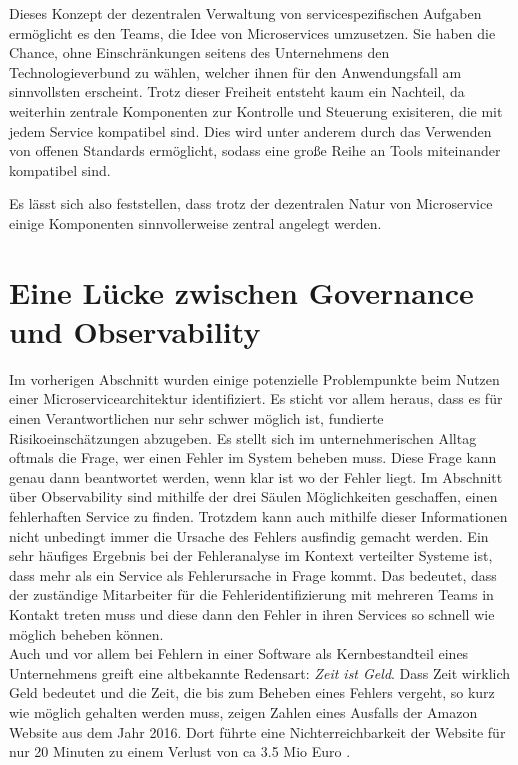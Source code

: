 Dieses Konzept der dezentralen Verwaltung von servicespezifischen Aufgaben ermöglicht es den Teams, die Idee von Microservices umzusetzen. Sie haben die Chance, ohne Einschränkungen seitens des Unternehmens den Technologieverbund zu wählen, welcher ihnen für den Anwendungsfall am sinnvollsten erscheint. Trotz dieser Freiheit entsteht kaum ein Nachteil, da weiterhin zentrale Komponenten zur Kontrolle und Steuerung exisiteren, die mit jedem Service kompatibel sind. Dies wird unter anderem durch das Verwenden von offenen Standards ermöglicht, sodass eine große Reihe an Tools miteinander kompatibel sind.

Es lässt sich also feststellen, dass trotz der dezentralen Natur von Microservice einige Komponenten sinnvollerweise zentral angelegt werden\autocite[S. 155ff]{microservice_enterprise}.

\section{Eine Lücke zwischen Governance und Observability}

Im vorherigen Abschnitt wurden einige potenzielle Problempunkte beim Nutzen einer Microservicearchitektur identifiziert. Es sticht vor allem heraus, dass es für einen Verantwortlichen nur sehr schwer möglich ist, fundierte Risikoeinschätzungen abzugeben. Es stellt sich im unternehmerischen Alltag oftmals die Frage, wer einen Fehler im System beheben muss. Diese Frage kann genau dann beantwortet werden, wenn klar ist wo der Fehler liegt. Im Abschnitt über Observability sind mithilfe der drei Säulen Möglichkeiten geschaffen, einen fehlerhaften Service zu finden. Trotzdem kann auch mithilfe dieser Informationen nicht unbedingt immer die Ursache des Fehlers ausfindig gemacht werden. Ein sehr häufiges Ergebnis bei der Fehleranalyse im Kontext verteilter Systeme ist, dass mehr als ein Service als Fehlerursache in Frage kommt. Das bedeutet, dass der zuständige Mitarbeiter für die Fehleridentifizierung mit mehreren Teams in Kontakt treten muss und diese dann den Fehler in ihren Services so schnell wie möglich beheben können. \\
Auch und vor allem bei Fehlern in einer Software als Kernbestandteil eines Unternehmens greift eine altbekannte Redensart: \textit{Zeit ist Geld}. Dass Zeit wirklich Geld bedeutet und die Zeit, die bis zum Beheben eines Fehlers vergeht, so kurz wie möglich gehalten werden muss, zeigen Zahlen eines Ausfalls der Amazon Website aus dem Jahr 2016. Dort führte eine Nichterreichbarkeit der Website für nur 20 Minuten zu einem Verlust von ca 3.5 Mio Euro .

